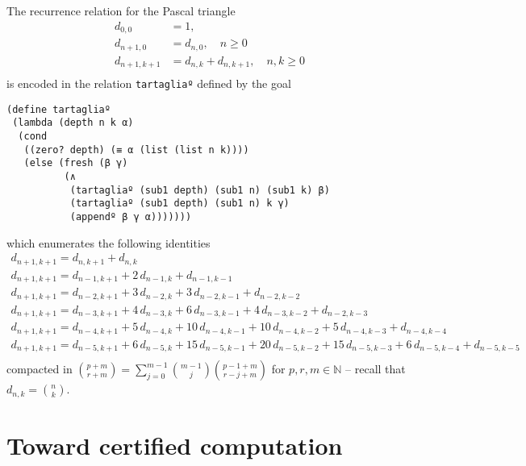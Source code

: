 \begin{example}
The recurrence relation for the Pascal triangle
\begin{displaymath}
\begin{split}
d_{0,0} &= 1, \\
d_{n+1, 0} &= d_{n,0}, \quad n \geq 0 \\
d_{n+1, k+1} &= d_{n,k} + d_{n,k+1}, \quad n,k \geq 0 \\
\end{split}
\end{displaymath}
is encoded in the relation \verb|tartagliaº| defined by the goal
\begin{verbatim}
(define tartagliaº
 (lambda (depth n k α)
  (cond
   ((zero? depth) (≡ α (list (list n k))))
   (else (fresh (β γ)
          (∧
           (tartagliaº (sub1 depth) (sub1 n) (sub1 k) β)
           (tartagliaº (sub1 depth) (sub1 n) k γ)
           (appendº β γ α)))))))
\end{verbatim}
which enumerates the following identities
\begin{displaymath}
    \begin{array}{c}
      d_{n+1,k+1} = d_{n,k+1} + d_{n,k} \\
      d_{n+1,k+1} = d_{n-1, k+1} + 2\,d_{n-1,k} + d_{n-1,k-1}  \\
      d_{n+1,k+1} = d_{n-2, k+1} + 3\,d_{n-2,k} + 3\,d_{n-2,k-1} + d_{n-2,k-2} \\
      d_{n+1,k+1} = d_{n-3, k+1} + 4\,d_{n-3,k} + 6\,d_{n-3,k-1} + 4\,d_{n-3,k-2} + d_{n-2,k-3} \\
      d_{n+1,k+1} = d_{n-4, k+1} + 5\,d_{n-4,k} + 10\,d_{n-4,k-1} + 10\,d_{n-4,k-2} + 5\,d_{n-4,k-3} + d_{n-4,k-4} \\
      d_{n+1,k+1} = d_{n-5, k+1} + 6\,d_{n-5,k} +15\,d_{n-5,k-1} + 20\,d_{n-5,k-2} +15\,d_{n-5,k-3} + 6\,d_{n-5,k-4} + d_{n-5,k-5} \\
    \end{array}
\end{displaymath}
compacted in $\displaystyle { {p+m}\choose{r+m} } = \sum_{j=0}^{m-1}{{
{m-1}\choose{j} }{ {p-1+m}\choose{r-j+m} }}$ for $p,r,m\in\mathbb{N}$
-- recall that $\displaystyle d_{n,k}={ {n}\choose{k} }$.
\end{example}

\section{Toward certified computation}
\label{sec:introduction}


